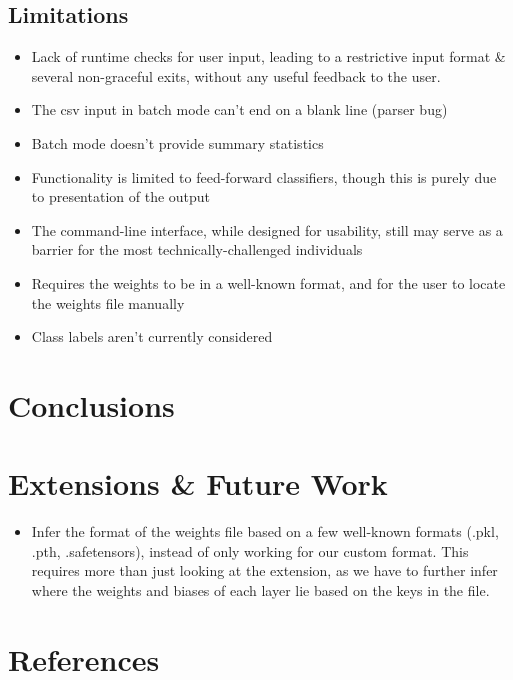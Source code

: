 \documentclass[12pt, titlepage]{article}
\begin{document}
\subsection{Limitations}
\begin{itemize}
	\item Lack of runtime checks for user input, leading to a restrictive input format \& several non-graceful exits, without any useful feedback to the user.
	\item The csv input in batch mode can't end on a blank line (parser bug)
	\item Batch mode doesn't provide summary statistics
	
	\item Functionality is limited to feed-forward classifiers, though this is purely due to presentation of the output
	\item The command-line interface, while designed for usability, still may serve as a barrier for the most technically-challenged individuals
	\item Requires the weights to be in a well-known format, and for the user to locate the weights file manually
	\item Class labels aren't currently considered
\end{itemize}

\section{Conclusions}

\section{Extensions \& Future Work}
\begin{itemize}
	\item Infer the format of the weights file based on a few well-known formats (.pkl, .pth, .safetensors), instead of only working for our custom format. This requires more than just looking at the extension, as we have to further infer where the weights and biases of each layer lie based on the keys in the file. 
\end{itemize}

\section{References}
\end{document}
